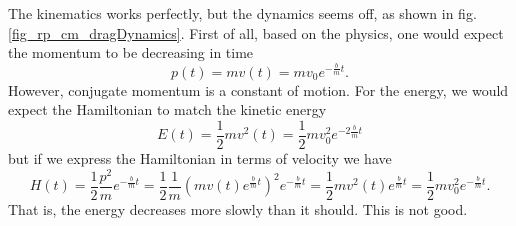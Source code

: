 The kinematics works perfectly, but the dynamics seems off, as shown in fig. \ref{fig_rp_cm_dragDynamics}. First of all, based on the physics, one would expect the momentum to be decreasing in time
\begin{equation}
	p(t)=m v(t) = m v_0 e^{-\frac{b}{m}t}.
\end{equation}
However, conjugate momentum is a constant of motion. For the energy, we would expect the Hamiltonian to match the kinetic energy
\begin{equation}
	E(t)=\frac{1}{2} m v^2(t) = \frac{1}{2} m v_0^2 e^{-2\frac{b}{m}t}
\end{equation}
but if we express the Hamiltonian in terms of velocity we have
\begin{equation}
	H(t)=\frac{1}{2} \frac{p^2}{m} e^{-\frac{b}{m}t} = \frac{1}{2} \frac{1}{m} \left( m v(t) e^{\frac{b}{m}t} \right)^2 e^{-\frac{b}{m}t}= \frac{1}{2} m v^2(t) e^{\frac{b}{m}t} = \frac{1}{2} m v_0^2 e^{-\frac{b}{m}t}.
\end{equation}
That is, the energy decreases more slowly than it should. This is not good.

